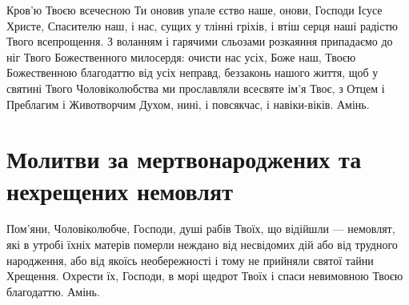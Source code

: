 \documentclass[chapters.tex]{subfiles}
\begin{document}
Кров’ю Твоєю всечесною Ти оновив упале єство наше, онови, Господи Ісусе Христе, Спасителю наш, і нас, сущих у тлінні гріхів, і втіш серця наші радістю Твого всепрощення. З воланням і гарячими сльозами розкаяння припадаємо до ніг Твого Божественного милосердя: очисти нас усіх, Боже наш, Твоєю Божественною благодаттю від усіх неправд, беззаконь нашого життя, щоб у святині Твого Чоловіколюбства ми прославляли всесвяте ім’я Твоє, з Отцем і Преблагим і Животворчим Духом, нині, і повсякчас, і навіки-віків. Амінь.

\section{Молитви за мертвонароджених та нехрещених немовлят}
Пом’яни, Чоловіколюбче, Господи, душі рабів Твоїх, що відійшли — немовлят, які в утробі їхніх матерів померли неждано від несвідомих дій або від трудного народження, або від якоїсь необережності і тому не прийняли святої тайни Хрещення. Охрести їх, Господи, в морі щедрот Твоїх і спаси невимовною Твоєю благодаттю. Амінь.
\end{document}
